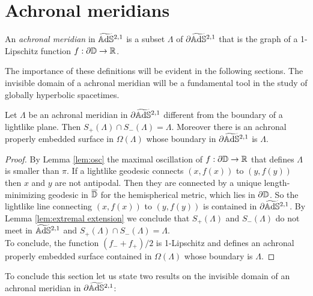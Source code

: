 \section{Achronal meridians}
\begin{definition}
    An \textit{achronal meridian} in $\widetilde{\mathbb{A}\mathrm{d}\mathbb{S}}{}^{2,1}$ is a subset $\Lambda$ of $\partial\widetilde{\mathbb{A}\mathrm{d}\mathbb{S}}{}^{2,1}$ that is the graph of a 1-Lipschitz function $f: \partial\mathbb{D}\to\mathbb{R}$.
\end{definition}
The importance of these definitions will be evident in the following sections.
The invisible domain of a achronal meridian will be a fundamental tool in the study of globally hyperbolic spacetimes.
\begin{lemma}
    Let $\Lambda$ be an achronal meridian in $\partial\widetilde{\mathbb{A}\mathrm{d}\mathbb{S}}{}^{2,1}$ different from the boundary of a lightlike plane. Then $S_+(\Lambda) \cap S_-(\Lambda)=\Lambda$. Moreover there is an achronal properly embedded surface in $\Omega(\Lambda)$ whose boundary in $\partial\widetilde{\mathbb{A}\mathrm{d}\mathbb{S}}{}^{2,1}$ is $\Lambda$.
\end{lemma}
\begin{proof}
    By Lemma \ref{lem:osc} the maximal oscillation of $f:\partial\mathbb{D} \to \mathbb{R}$ that defines $\Lambda$ is smaller than $\pi$. If a lightlike geodesic connects $(x,f(x))$ to $(y,f(y))$ then $x$ and $y$ are not antipodal. Then they are connected by a unique length-minimizing geodesic in $\overline{\mathbb{D}}$ for the hemispherical metric, which lies in $\partial\mathbb{D}$. So the lightlike line connecting $(x,f(x))$ to $(y,f(y))$ is contained in $\partial\widetilde{\mathbb{A}\mathrm{d}\mathbb{S}}{}^{2,1}$. By Lemma \ref{lem:extremal extension} we conclude that $S_+(\Lambda)$ and $S_-(\Lambda)$ do not meet in $\widetilde{\mathbb{A}\mathrm{d}\mathbb{S}}{}^{2,1}$ and $S_+(\Lambda)\cap S_-(\Lambda)=\Lambda$.\\
    To conclude, the function $(f_- + f_+) /2$ is 1-Lipschitz and defines an achronal properly embedded surface contained in $\Omega(\Lambda)$ whose boundary is $\Lambda$.
\end{proof}
To conclude this section let us state two results on the invisible domain of an achronal meridian in $\partial\widetilde{\mathbb{A}\mathrm{d}\mathbb{S}}{}^{2,1}$:


